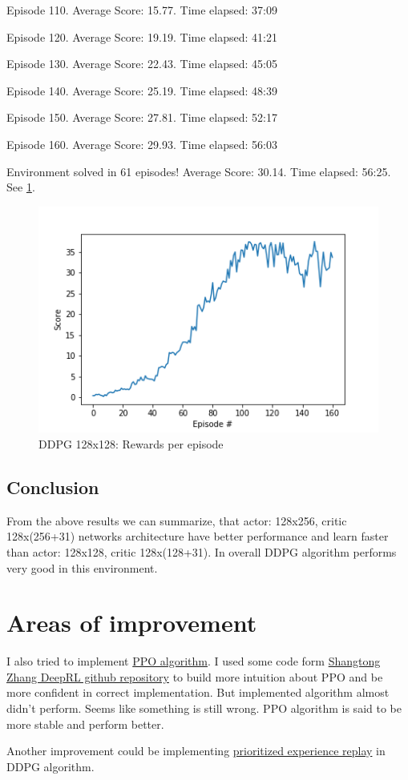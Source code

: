 \documentclass{report}
\begin{document}
Episode 110.	Average Score: 15.77.	Time elapsed: 37:09

Episode 120.	Average Score: 19.19.	Time elapsed: 41:21

Episode 130.	Average Score: 22.43.	Time elapsed: 45:05

Episode 140.	Average Score: 25.19.	Time elapsed: 48:39

Episode 150.	Average Score: 27.81.	Time elapsed: 52:17

Episode 160.	Average Score: 29.93.	Time elapsed: 56:03

Environment solved in 61 episodes!	Average Score: 30.14.	Time elapsed: 56:25. See \ref{fig:DDPG_128x128}.

\begin{figure}
	\includegraphics[width=0.9\linewidth]{res/ddpg_128x128/score.png}
	\caption{DDPG 128x128: Rewards per episode}
	\label{fig:DDPG_128x128}
\end{figure}


\subsection*{Conclusion}

From the above results we can summarize, that actor: 128x256, critic 128x(256+31) networks architecture have better performance and learn faster than actor: 128x128, critic 128x(128+31). In overall DDPG algorithm performs very good in this environment.


\section*{Areas of improvement}

I also tried to implement \href{https://arxiv.org/pdf/1707.06347.pdf}{PPO algorithm}. I used some code form \href{https://github.com/ShangtongZhang/DeepRL}{Shangtong Zhang DeepRL github repository} to build more intuition about PPO and be more confident in correct implementation. But implemented algorithm almost didn't perform. Seems like something is still wrong. PPO algorithm is said to be more stable and perform better.

Another improvement could be implementing \href{https://arxiv.org/abs/1511.05952}{prioritized experience replay} in DDPG algorithm.
\end{document}
